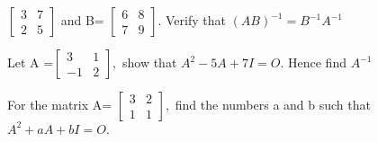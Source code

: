 $\begin{bmatrix}
3&7 \\ 2&5
\end{bmatrix}$ and B=
$\begin{bmatrix}
6&8 \\ 7&9
\end{bmatrix}.$ Verify that $(AB)^{-1}=B^{-1} A^{-1}$
\item Let A =$\begin{bmatrix}
3&1 \\ -1&2
\end{bmatrix},$ show that $A^2-5A+7I=O.$ Hence find $A^{-1}$
\solution 

\item For the matrix A= $\begin{bmatrix}
3&2 \\ 1&1
\end{bmatrix},$ find the numbers a and b such that $A^2+aA+bI=O.$
\\
\solution 


